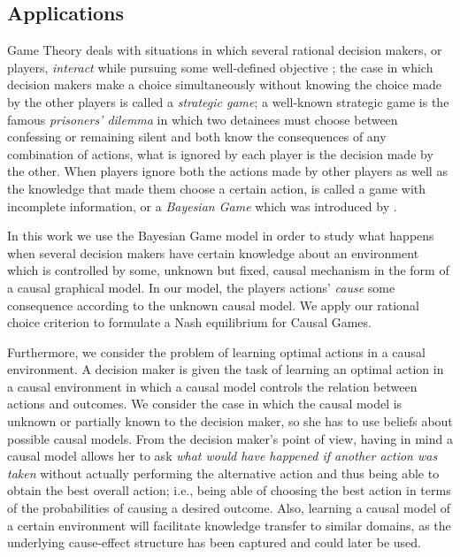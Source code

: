 \documentclass{svjour3}                     %
\begin{document}
\subsection{Applications}
Game Theory deals with situations in which several rational decision makers, or players, \textit{interact} while pursuing some well-defined objective \citep{osborne1994course}; the case in which decision makers make a choice simultaneously without knowing the choice made by the other players is called a \textit{strategic game}; a well-known strategic game is the famous \textit{prisoners' dilemma} in which two detainees must choose between confessing or remaining silent and both know the consequences of any combination of actions, what is ignored by each player is the decision made by the other. When players ignore both the actions made by other players as well as the knowledge that made them choose a certain action, is called a game with incomplete information, or a \textit{Bayesian Game} which was introduced by \cite{harsanyi1967games1,harsanyi1968games2,harsanyi1968games3}. 

In this work we use the Bayesian Game model in order to study what happens when several decision makers have certain knowledge about an environment which is controlled by some, unknown but fixed, causal mechanism in the form of a causal graphical model. In our model, the players actions' \textit{cause} some consequence according to the unknown causal model. We apply our rational choice criterion to formulate a Nash equilibrium for Causal Games.

Furthermore, we consider the problem of learning optimal actions in a causal environment. A decision maker is given the task of learning an optimal action in a causal environment in which a causal model controls the relation between actions and outcomes. We consider the case in which the causal model is unknown or partially known to the decision maker, so she has to use beliefs about possible causal models. From the decision maker's point of view, having in mind a causal model allows her to ask \textit{what would have happened if another action was taken} without actually performing the alternative action and thus being able to obtain the best overall action; i.e., being able of choosing the best action in terms of the probabilities of causing a desired outcome. Also, learning a causal model of a certain environment will facilitate knowledge transfer to similar domains, as the underlying cause-effect structure has been captured and could later be used.
\end{document}
